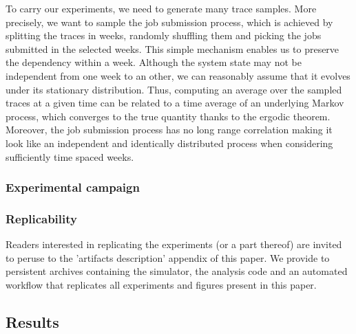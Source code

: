 \documentclass[sigconf]{acmart}
\begin{document}


To carry our experiments, we need to generate many trace samples. More precisely, we want
to sample the job submission process, which is achieved by splitting the traces in weeks,
randomly shuffling them and picking the jobs submitted in the selected weeks.  This simple
mechanism enables us to preserve the dependency within a week. Although the system state
may not be independent from one week to an other, we can reasonably assume that it evolves
under its stationary distribution. Thus, computing an average over the sampled traces at a
given time can be related to a time average of an underlying Markov process, which
converges to the true quantity thanks to the ergodic theorem.  Moreover, the job
submission process has no long range correlation making it look like an independent and
identically distributed process when considering sufficiently time spaced weeks.

\subsubsection{Experimental campaign}


\subsubsection{Replicability}

Readers interested in replicating the experiments (or a part thereof) are
invited to peruse to the 'artifacts description' appendix of this paper.  We
provide to persistent archives containing the simulator, the analysis code
and an automated workflow that replicates all experiments and figures
present in this paper.

\subsection{Results}
\label{sub:results}
\end{document}
